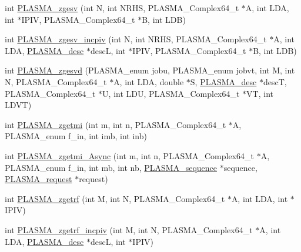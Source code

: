 \begin{DoxyCompactItemize}
\item 
int \hyperlink{group__PLASMA__Complex64__t_ga94397d6fba523c946f1e56cfe9aa967d_ga94397d6fba523c946f1e56cfe9aa967d}{P\+L\+A\+S\+M\+A\+\_\+zgesv} (int N, int N\+R\+H\+S, P\+L\+A\+S\+M\+A\+\_\+\+Complex64\+\_\+t $\ast$A, int L\+D\+A, int $\ast$I\+P\+I\+V, P\+L\+A\+S\+M\+A\+\_\+\+Complex64\+\_\+t $\ast$B, int L\+D\+B)
\item 
int \hyperlink{group__PLASMA__Complex64__t_ga27916109c8ac4bed6d101fcb98b27fad_ga27916109c8ac4bed6d101fcb98b27fad}{P\+L\+A\+S\+M\+A\+\_\+zgesv\+\_\+incpiv} (int N, int N\+R\+H\+S, P\+L\+A\+S\+M\+A\+\_\+\+Complex64\+\_\+t $\ast$A, int L\+D\+A, \hyperlink{structplasma__desc__t}{P\+L\+A\+S\+M\+A\+\_\+desc} $\ast$desc\+L, int $\ast$I\+P\+I\+V, P\+L\+A\+S\+M\+A\+\_\+\+Complex64\+\_\+t $\ast$B, int L\+D\+B)
\item 
int \hyperlink{group__PLASMA__Complex64__t_ga947d0b69e1be45578bb8b869ac06b963_ga947d0b69e1be45578bb8b869ac06b963}{P\+L\+A\+S\+M\+A\+\_\+zgesvd} (P\+L\+A\+S\+M\+A\+\_\+enum jobu, P\+L\+A\+S\+M\+A\+\_\+enum jobvt, int M, int N, P\+L\+A\+S\+M\+A\+\_\+\+Complex64\+\_\+t $\ast$A, int L\+D\+A, double $\ast$S, \hyperlink{structplasma__desc__t}{P\+L\+A\+S\+M\+A\+\_\+desc} $\ast$desc\+T, P\+L\+A\+S\+M\+A\+\_\+\+Complex64\+\_\+t $\ast$U, int L\+D\+U, P\+L\+A\+S\+M\+A\+\_\+\+Complex64\+\_\+t $\ast$V\+T, int L\+D\+V\+T)
\item 
int \hyperlink{group__PLASMA__Complex64__t_ga99eb4e6c8abbc3554915bd39fbfccd5f_ga99eb4e6c8abbc3554915bd39fbfccd5f}{P\+L\+A\+S\+M\+A\+\_\+zgetmi} (int m, int n, P\+L\+A\+S\+M\+A\+\_\+\+Complex64\+\_\+t $\ast$A, P\+L\+A\+S\+M\+A\+\_\+enum f\+\_\+in, int imb, int inb)
\item 
int \hyperlink{group__PLASMA__Complex64__t_gae62185bc663caecb088bc271fd84e06b_gae62185bc663caecb088bc271fd84e06b}{P\+L\+A\+S\+M\+A\+\_\+zgetmi\+\_\+\+Async} (int m, int n, P\+L\+A\+S\+M\+A\+\_\+\+Complex64\+\_\+t $\ast$A, P\+L\+A\+S\+M\+A\+\_\+enum f\+\_\+in, int mb, int nb, \hyperlink{structplasma__sequence__t}{P\+L\+A\+S\+M\+A\+\_\+sequence} $\ast$sequence, \hyperlink{structplasma__request__t}{P\+L\+A\+S\+M\+A\+\_\+request} $\ast$request)
\item 
int \hyperlink{group__PLASMA__Complex64__t_ga03449aa4e83b2f2223dad281d122697d_ga03449aa4e83b2f2223dad281d122697d}{P\+L\+A\+S\+M\+A\+\_\+zgetrf} (int M, int N, P\+L\+A\+S\+M\+A\+\_\+\+Complex64\+\_\+t $\ast$A, int L\+D\+A, int $\ast$I\+P\+I\+V)
\item 
int \hyperlink{group__PLASMA__Complex64__t_ga085b5e62180512c7c603e72a9092ad8d_ga085b5e62180512c7c603e72a9092ad8d}{P\+L\+A\+S\+M\+A\+\_\+zgetrf\+\_\+incpiv} (int M, int N, P\+L\+A\+S\+M\+A\+\_\+\+Complex64\+\_\+t $\ast$A, int L\+D\+A, \hyperlink{structplasma__desc__t}{P\+L\+A\+S\+M\+A\+\_\+desc} $\ast$desc\+L, int $\ast$I\+P\+I\+V)

\end{DoxyCompactItemize}

